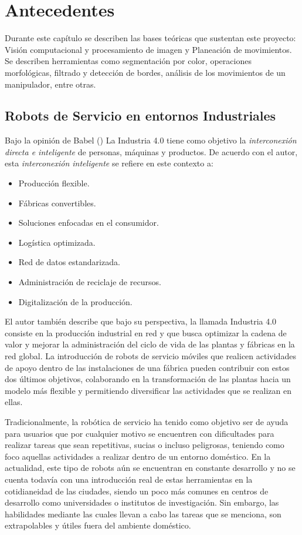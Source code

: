 \chapter{Antecedentes}
Durante este capítulo se describen las bases teóricas que sustentan este proyecto: Visión computacional y procesamiento de imagen y Planeación de movimientos. Se describen herramientas como segmentación por color, operaciones morfológicas, filtrado y detección de bordes, análisis de los movimientos de un manipulador, entre otras.

\section{Robots de Servicio en entornos Industriales}

Bajo la opinión de Babel (\cite*{babel_industry_2022}) La Industria 4.0 tiene como objetivo la \textit{interconexión directa e inteligente} de  personas, máquinas y productos. De acuerdo con el autor, esta \textit{interconexión inteligente} se refiere en este contexto a:
 \begin{itemize}
     \item Producción flexible.
     \item Fábricas convertibles.
     \item Soluciones enfocadas en el consumidor.
     \item Logística optimizada.
     \item Red de datos estandarizada.
     \item Administración de reciclaje de recursos.
     \item Digitalización de la producción.
 \end{itemize}

 El autor también describe que bajo su perspectiva, la llamada Industria 4.0 consiste en la producción industrial en red y que busca optimizar la cadena de valor y mejorar la administración del ciclo de vida de las plantas y fábricas en la red global. La introducción de robots de servicio móviles que realicen actividades de apoyo dentro de las instalaciones de una fábrica pueden contribuir con estos dos últimos objetivos, colaborando en la transformación de las plantas hacia un modelo más flexible y permitiendo diversificar las actividades que se realizan en ellas.

Tradicionalmente, la robótica de servicio ha tenido como objetivo ser de ayuda para usuarios que por cualquier motivo se encuentren con dificultades para realizar tareas que sean repetitivas, sucias o incluso peligrosas, teniendo como foco aquellas actividades a realizar dentro de un entorno doméstico. En la actualidad, este tipo de robots aún se encuentran en constante desarrollo y no se cuenta todavía con una introducción real de estas herramientas en la cotidianeidad de las ciudades, siendo un poco más comunes en centros de desarrollo como universidades o institutos de investigación. Sin embargo, las habilidades mediante las cuales llevan a cabo las tareas que se menciona, son extrapolables y útiles fuera del ambiente doméstico. 

